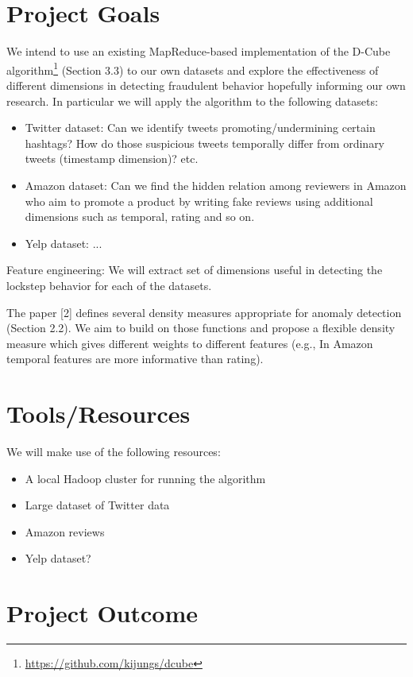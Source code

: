 \documentclass[12pt]{article}
\begin{document}
\section{Project Goals}

We intend to use an existing MapReduce-based implementation of the D-Cube algorithm\footnote{\href{https://github.com/kijungs/dcube}{https://github.com/kijungs/dcube}} (Section 3.3) to our own datasets and explore the effectiveness of different dimensions in detecting fraudulent behavior hopefully informing our own research. In particular we will apply the algorithm to the following datasets:
\begin{itemize}
\item Twitter dataset: Can we identify tweets promoting/undermining certain hashtags? How do those suspicious tweets temporally differ from ordinary tweets (timestamp dimension)? etc. 
\item Amazon dataset: Can we find the hidden relation among reviewers in Amazon who aim to promote a product by writing fake reviews using  additional dimensions such as temporal, rating and so on.  
\item Yelp dataset: ...
\end{itemize}

Feature engineering: We will extract set of dimensions useful in detecting the lockstep behavior for each of the datasets.	

The paper [2] defines several density measures appropriate for anomaly detection (Section 2.2). We aim to build on those functions and propose a flexible density measure which gives different weights to different features (e.g., In Amazon temporal features are more informative than rating).  
 
\section{Tools/Resources}
We will make use of the following resources:
\begin{itemize}
	\item A local Hadoop cluster for running the algorithm
	\item Large dataset of Twitter data
	\item Amazon reviews
	\item Yelp dataset?
\end{itemize}

\section{Project Outcome}
\end{document}
